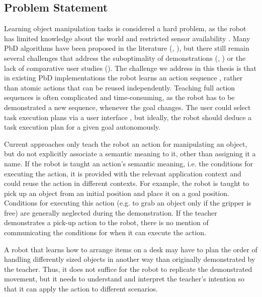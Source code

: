 

\subsection{Problem Statement}
Learning object manipulation tasks is considered a hard problem, as the robot has limited knowledge about the world and restricted sensor availability \cite{ekvall2008robot}.
Many PbD algorithms have been proposed in the literature (\cite{argall2009survey}, \cite{billing2010formalism}), but there still remain several challenges that address the suboptimality of demonstrations (\cite{chen2003programing}, \cite{kaiser1995obtaining}) or the lack of comparative user studies (\cite{suay2012practical}).
The challenge we address in this thesis is that in existing PbD implementations the robot learns an action sequence \cite{orendt2016robot,peppoloni2014ros}, rather than atomic actions that can be reused independently. 
Teaching full action sequences is often complicated and time-consuming, as the robot has to be demonstrated a new sequence, whenever the goal changes.
The user could select task execution plans via a user interface \cite{guerin2015framework}, but ideally, the robot should deduce a task execution plan for a given goal autonomously.

Current approaches only teach the robot an action for manipulating an object, but do not explicitly associate a semantic meaning to it, other than assigning it a name.
If the robot is taught an action's semantic meaning, i.e. the conditions for executing the action, it is provided with the relevant application context and could reuse the action in different contexts.
For example, the robot is taught to pick up an object from an initial position and place it on a goal position.
Conditions for executing this action (e.g. to grab an object only if the gripper is free) are generally neglected during the demonstration.
If the teacher demonstrates a pick-up action to the robot, there is no mention of communicating the conditions for when it can execute the action.

A robot that learns how to arrange items on a desk may have to plan the order of handling differently sized objects in another way than originally demonstrated by the teacher.
Thus, it does not suffice for the robot to replicate the demonstrated movement, but it needs to understand and interpret the teacher's intention so that it can apply the action to different scenarios.

